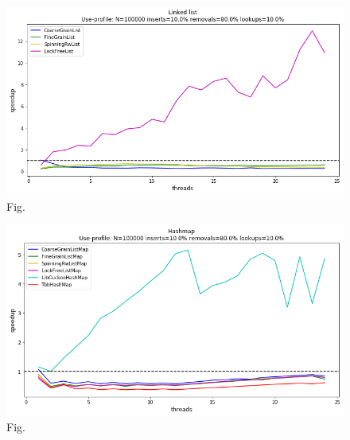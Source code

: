 \documentclass[11pt]{article}
\begin{document}

\begin{figure}[h]
\centering
\includegraphics[width=1.0\linewidth]{figs/lateday/combined/lateday_combined_list_insert_10_lookup_10_removal_80}
\caption{Fig.}
\label{fig:fig1}
\end{figure}

\begin{figure}[h]
\centering
\includegraphics[width=0.5\linewidth]{figs/lateday/combined/lateday_combined_map_insert_10_lookup_10_removal_80}
\caption{Fig.}
\label{fig:fig2}
\end{figure}

\printbibliography
\end{document}
